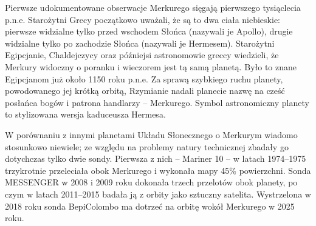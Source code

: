 \documentclass[12pt, letterpaper, titlepage]{article}
\begin{document}
Pierwsze udokumentowane obserwacje Merkurego sięgają pierwszego tysiąclecia p.n.e. Starożytni Grecy początkowo uważali, że są to dwa ciała niebieskie: pierwsze widzialne tylko przed wschodem Słońca (nazywali je Apollo), drugie widzialne tylko po zachodzie Słońca (nazywali je Hermesem). Starożytni Egipcjanie, Chaldejczycy oraz późniejsi astronomowie greccy wiedzieli, że Merkury widoczny o poranku i wieczorem jest tą samą planetą. Było to znane Egipcjanom już około 1150 roku p.n.e. Za sprawą szybkiego ruchu planety, powodowanego jej krótką orbitą, Rzymianie nadali planecie nazwę na cześć posłańca bogów i patrona handlarzy – Merkurego. Symbol astronomiczny planety to stylizowana wersja kaduceusza Hermesa.

W porównaniu z innymi planetami Układu Słonecznego o Merkurym wiadomo stosunkowo niewiele; ze względu na problemy natury technicznej zbadały go dotychczas tylko dwie sondy. Pierwsza z nich – Mariner 10 – w latach 1974–1975 trzykrotnie przeleciała obok Merkurego i wykonała mapy 45\% powierzchni. Sonda MESSENGER w 2008 i 2009 roku dokonała trzech przelotów obok planety, po czym w latach 2011–2015 badała ją z orbity jako sztuczny satelita. Wystrzelona w 2018 roku sonda BepiColombo ma dotrzeć na orbitę wokół Merkurego w 2025 roku.
\newpage
\end{document}
